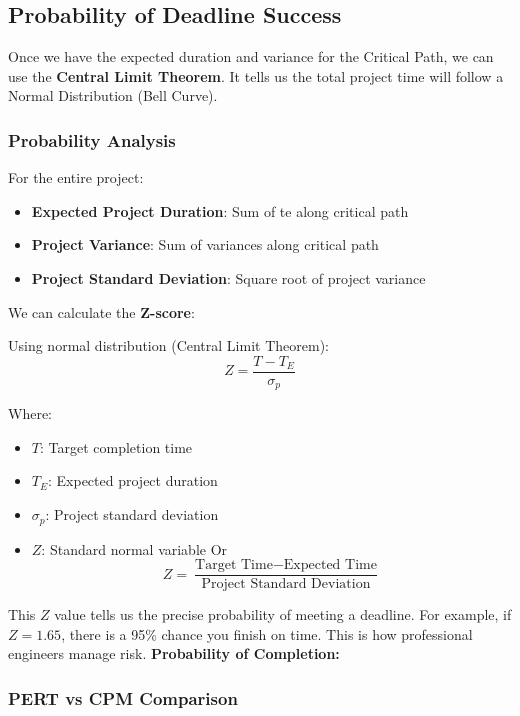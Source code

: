 \documentclass[
  letterpaper,
  DIV=11,
  numbers=noendperiod]{scrreprt}
\providecommand{\tightlist}{%
  \setlength{\itemsep}{0pt}\setlength{\parskip}{0pt}}
\begin{document}
\subsection{Probability of Deadline
Success}\label{probability-of-deadline-success}

Once we have the expected duration and variance for the Critical Path,
we can use the \textbf{Central Limit Theorem}. It tells us the total
project time will follow a Normal Distribution (Bell Curve).

\subsubsection{Probability Analysis}\label{probability-analysis}

For the entire project:

\begin{itemize}
\tightlist
\item
  \textbf{Expected Project Duration}: Sum of te along critical path
\item
  \textbf{Project Variance}: Sum of variances along critical path
\item
  \textbf{Project Standard Deviation}: Square root of project variance
\end{itemize}

We can calculate the \textbf{Z-score}:

Using normal distribution (Central Limit Theorem): \[
Z = \frac{T - T_E}{\sigma_p}
\]

Where:

\begin{itemize}
\tightlist
\item
  \(T\): Target completion time
\item
  \(T_E\): Expected project duration
\item
  \(\sigma_p\): Project standard deviation
\item
  \(Z\): Standard normal variable Or
  \[Z = \frac{\text{Target Time} - \text{Expected Time}}{\text{Project Standard Deviation}}\]
\end{itemize}

This \(Z\) value tells us the precise probability of meeting a deadline.
For example, if \(Z=1.65\), there is a 95\% chance you finish on time.
This is how professional engineers manage risk. \textbf{Probability of
Completion:}

\subsubsection{PERT vs CPM Comparison}\label{pert-vs-cpm-comparison}
\end{document}
